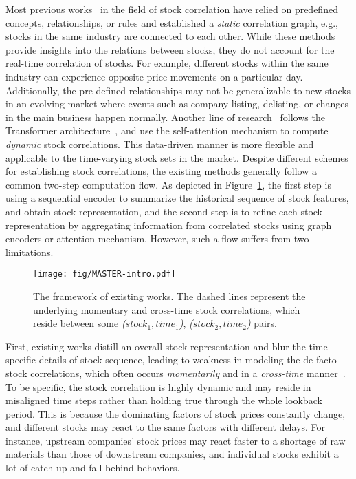 Most previous works~\cite{feng2019temporal, xu2021hist, wang2021hierarchical, wang2022adaptive, wang2022review} in the field of stock correlation have relied on predefined concepts, relationships, or rules and established a \emph{static} correlation graph, e.g., stocks in the same industry are connected to each other.
While these methods provide insights into the relations between stocks, they do not account for the real-time correlation of stocks.
For example, different stocks within the same industry can experience opposite price movements on a particular day.
Additionally, the pre-defined relationships may not be generalizable to new stocks in an evolving market where events such as company listing, delisting, or changes in the main business happen normally.
Another line of research~\cite{yoo2021accurate} follows the Transformer architecture~\cite{vaswani2017attention}, and use the self-attention mechanism to compute \emph{dynamic} stock correlations. 
This data-driven manner is more flexible and applicable to the time-varying stock sets in the market.
Despite different schemes for establishing stock correlations, the existing methods generally follow a common two-step computation flow. As depicted in Figure~\ref{fig:ts}, the first step is using a sequential encoder to summarize the historical sequence of stock features, and obtain stock representation, and the second step is to refine each stock representation by aggregating information from correlated stocks using graph encoders or attention mechanism. 
However, such a flow suffers from two limitations.

\begin{figure}
    \centering
    \texttt{[image: fig/MASTER-intro.pdf]}
    \caption{The framework of existing works. The dashed lines represent the underlying momentary and cross-time stock correlations, which reside between some \textit{($stock_1, time_1$)}, \textit{($stock_2, time_2$)} pairs.}
    \label{fig:ts} 
\end{figure}

First, existing works distill an overall stock representation and blur the time-specific details of stock sequence, leading to weakness in modeling the de-facto stock correlations, which often occurs \emph{momentarily} and in a \emph{cross-time} manner~\cite{bennett2022lead}.
To be specific, the stock correlation is highly dynamic and may reside in misaligned time steps rather than holding true through the whole lookback period.
This is because the dominating factors of stock prices constantly change, and different stocks may react to the same factors with different delays. For instance, upstream companies' stock prices may react faster to a shortage of raw materials than those of downstream companies, and individual stocks exhibit a lot of catch-up and fall-behind behaviors. 

